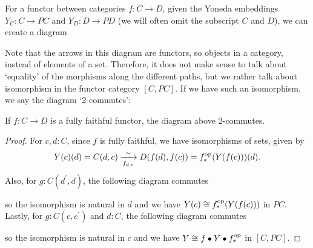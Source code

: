 For a functor between categories $ f: C \to D $, given the Yoneda embeddings $ Y_C : C \to P C $ and $ Y_D : D \to P D $ (we will often omit the subscript $ C $ and $ D $), we can create a diagram
\begin{center}
\end{center}
Note that the arrows in this diagram are functors, so objects in a category, instead of elements of a set. Therefore, it does not make sense to talk about `equality' of the morphisms along the different paths, but we rather talk about isomorphism in the functor category $ [C, P C] $. If we have such an isomorphism, we say the diagram `2-commutes':
\begin{lemma}\label{lem:Yoneda-restriction-commutes}
  If $ f: C \to D $ is a fully faithful functor, the diagram above 2-commutes.
\end{lemma}
\begin{proof}
  For $ c, d : C $, since $ f $ is fully faithful, we have isomorphisms of sets, given by
  \[ Y(c)(d) = C(d, c) \xrightarrow[f_{d, c}]{\sim} D(f(d), f(c)) = f^{\text{op}}_*(Y(f(c)))(d). \]
  Also, for $ g: C(d^\prime, d) $, the following diagram commutes
  \begin{center}
  \end{center}
  so the isomorphism is natural in $ d $ and we have $ Y(c) \cong f^{\text{op}}_*(Y(f(c))) $ in $ P C $. Lastly, for $ g: C(c, c^\prime) $ and $ d: C $, the following diagram commutes
  \begin{center}
  \end{center}
  so the isomorphism is natural in $ c $ and we have $ Y \cong f \bullet Y \bullet f^{\text{op}}_* $ in $ [C, P C] $.
\end{proof}

